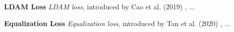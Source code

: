 \myindent \textbf{LDAM Loss} \textit{LDAM loss}, introduced by Cao et al. (2019) \cite{cao2019learningimbalanceddatasetslabeldistributionaware}, ...

\myindent \textbf{Equalization Loss} \textit{Equalization loss}, introduced by Tan et al. (2020) \cite{tan2020equalizationlosslongtailedobject}, ...







